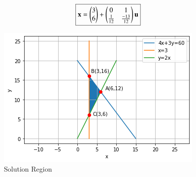 \begin{align}
    \boxed{\mathbf{x} = \begin{pmatrix}3 \\ 6\end{pmatrix}+\begin{pmatrix}0 & 1\\\frac{1}{12} & \frac{-13}{12}\end{pmatrix}\mathbf{u}}
\end{align}


\begin{figure}[!ht]
\centering
\includegraphics[width=\columnwidth]{solutions/su2021/2/57/Figures/Figure11_1.png}
\caption{Solution Region}
\label{ineq/2/57fig:fig1}	
\end{figure}





%
